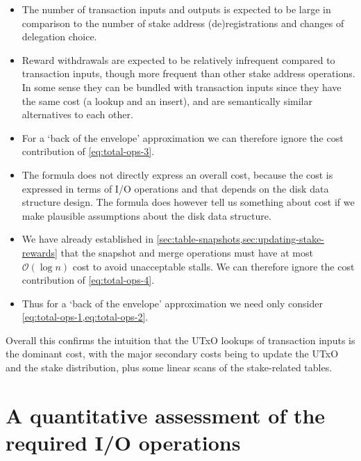 \documentclass[11pt,a4paper]{article}
\begin{document}
\begin{itemize}
\item The number of transaction inputs and outputs is expected to be large in
      comparison to the number of stake address (de)registrations and changes
      of delegation choice.

\item Reward withdrawals are expected to be relatively infrequent compared to
      transaction inputs, though more frequent than other stake address
      operations. In some sense they can be bundled with transaction inputs
      since they have the same cost (a {\sc lookup} and an {\sc insert}), and
      are semantically similar alternatives to each other.

\item For a `back of the envelope' approximation we can therefore ignore
      the cost contribution of \cref{eq:total-ops-3}.

\item The formula does not directly express an overall cost, because the cost
      is expressed in terms of I/O operations and that depends on the disk data
      structure design. The formula does however tell us something about cost
      if we make plausible assumptions about the disk data structure.

\item We have already established in
      \cref{sec:table-snapshots,sec:updating-stake-rewards} that the
      {\sc snapshot} and {\sc merge} operations must have at most
      $\mathcal{O}(\log n)$ cost to avoid unacceptable stalls. We can
      therefore ignore the cost contribution of \cref{eq:total-ops-4}.

\item Thus for a `back of the envelope' approximation we need only consider
      \cref{eq:total-ops-1,eq:total-ops-2}.
\end{itemize}

Overall this confirms the intuition that the UTxO lookups of transaction
inputs is the dominant cost, with the major secondary costs being to update the
UTxO and the stake distribution, plus some linear scans of the stake-related
tables.


\section{A quantitative assessment of the required I/O operations}
\label{sec:quantitative-assessment-of-the-required-io-operations}
\end{document}
